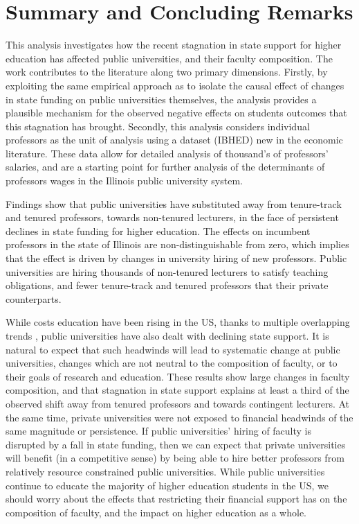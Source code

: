 \section{Summary and Concluding Remarks}
\label{sec:conclusion}

This analysis investigates how the recent stagnation in state support for higher education has affected public universities, and their faculty composition.
The work contributes to the literature along two primary dimensions.
Firstly, by exploiting the same empirical approach as \cite{NBERw23736,NBERw27885} to isolate the causal effect of changes in state funding on public universities themselves, the analysis provides a plausible mechanism for the observed negative effects on students outcomes that this stagnation has brought.
Secondly, this analysis considers individual professors as the unit of analysis using a dataset (IBHED) new in the economic literature.
These data allow for detailed analysis of thousand's of professors' salaries, and are a starting point for further analysis of the determinants of professors wages in the Illinois public university system. 

Findings show that public universities have substituted away from tenure-track and tenured professors, towards non-tenured lecturers, in the face of persistent declines in state funding for higher education.
The effects on incumbent professors in the state of Illinois are non-distinguishable from zero, which implies that the effect is driven by changes in university hiring of new professors.
Public universities are hiring thousands of non-tenured lecturers to satisfy teaching obligations, and fewer tenure-track and tenured professors that their private counterparts.

While costs education have been rising in the US, thanks to multiple overlapping trends \citep{ehrenberg2012}, public universities have also dealt with declining state support.
It is natural to expect that such headwinds will lead to systematic change at public universities, changes which are not neutral to the composition of faculty, or to their goals of research and education.
These results show large changes in faculty composition, and that stagnation in state support explains at least a third of the observed shift away from tenured professors and towards contingent lecturers.
At the same time, private universities were not exposed to financial headwinds of the same magnitude or persistence.
If public universities' hiring of faculty is disrupted by a fall in state funding, then we can expect that private universities will benefit (in a competitive sense) by being able to hire better professors from relatively resource constrained public universities.
While public universities continue to educate the majority of higher education students in the US, we should worry about the effects that restricting their financial support has on the composition of faculty, and the impact on higher education as a whole.
